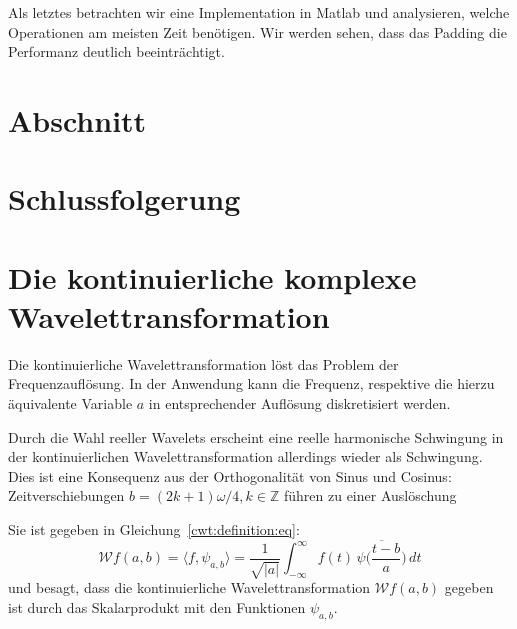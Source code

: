 \begin{refsection}
Als letztes betrachten wir eine Implementation in Matlab und analysieren, welche Operationen am meisten Zeit benötigen.
Wir werden sehen, dass das Padding die Performanz deutlich beeinträchtigt.


\section{Abschnitt}

\section{Schlussfolgerung}

\section{Die kontinuierliche komplexe Wavelettransformation}
Die kontinuierliche Wavelettransformation löst das Problem der Frequenzauflösung.
In der Anwendung kann die Frequenz, respektive die hierzu äquivalente Variable $a$ in entsprechender Auflösung diskretisiert werden.

Durch die Wahl reeller Wavelets erscheint eine reelle harmonische Schwingung in der kontinuierlichen Wavelettransformation allerdings wieder als Schwingung.
Dies ist eine Konsequenz aus der Orthogonalität von Sinus und Cosinus: Zeitverschiebungen $b = (2k+1)\omega / 4, k \in\mathbb Z$ führen zu einer Auslöschung

Sie ist gegeben in Gleichung~\eqref{cwt:definition:eq}:
\[
\mathcal{W}f (a,b)
=
\langle f,\psi_{a,b}\rangle
=
\frac{1}{\sqrt{|a|}}\int_{-\infty}^\infty f(t)\,\overline{
	\psi\biggl(\frac{t-b}{a}\biggr)}\,dt
\]
und besagt, dass die kontinuierliche Wavelettransformation $\mathcal{W}f(a,b)$ gegeben ist durch das Skalarprodukt mit den Funktionen $\psi_{a,b}$.


\printbibliography[heading=subbibliography]
\end{refsection}
